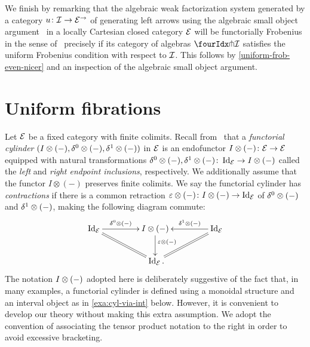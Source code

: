 \documentclass[reqno,10pt,a4paper,oneside,draft]{amsart}
\begin{document}
We finish by remarking that the algebraic weak factorization system generated by a category $u \co \cal{I} \to \cal{E}^\to$ of generating left arrows using the algebraic small object argument~\cite{garner:small-object-argument} in a locally Cartesian closed category $\cal{E}$ will be functorially Frobenius in the sense of~\cite{garner:topological-simplicial} precisely if its category of algebras $\liftr{\cal{I}}$ satisfies the uniform Frobenius condition with respect to $\cal{I}$.
This follows by \cref{uniform-frob-even-nicer} and an inspection of the algebraic small object argument.

\section{Uniform fibrations}
\label{sec:unif}


Let $\catE$ be a fixed category with finite colimits.
Recall from~\cite{kamps-porter:homotopy} that a \emph{functorial cylinder} $(\interval \otimes (-), \lcyl \otimes (-), \rcyl \otimes (-))$ in $\calE$ is an endofunctor $\interval \otimes (-) \co \catE \to \catE$ equipped with natural transformations $\lcyl \otimes (-), \rcyl \otimes (-) \co \Id_\catE \to \interval \otimes (-)$ called the \emph{left} and \emph{right endpoint inclusions}, respectively.
We additionally assume that the functor $I \otimes (-)$ preserves finite colimits.
We say the functorial cylinder has \emph{contractions} if there is a common retraction $\ccyl \otimes (-) \co \interval \otimes (-) \to \Id_\catE$ of $\lcyl \otimes (-)$ and $\rcyl \otimes (-)$, making the following diagram commute:
\[
\xymatrix@C+2em{
  \Id_\catE
  \ar[r]^-{\lcyl \otimes (-)}
  \ar@{=}[dr]
&
  \interval \otimes (-)
  \ar[d]^(0.4){\ccyl \otimes (-)}
&
  \Id_\catE
  \ar[l]_-{\rcyl \otimes (-)}
  \ar@{=}[dl]
\\&
  \Id_\catE
\rlap{.}}
\]
The notation $\interval \otimes (-)$ adopted here is deliberately suggestive of the fact that, in many examples, a functorial cylinder is defined using a monoidal structure and an interval object as in \cref{exa:cyl-via-int} below.
However, it is convenient to develop our theory without making this extra assumption.
We adopt the convention of associating the tensor product notation to the right in order to avoid excessive bracketing.
\end{document}

